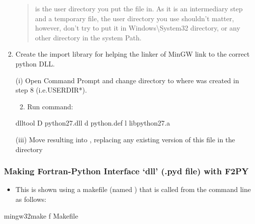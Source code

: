 \documentclass[letterpaper,10pt,english]{sphinxmanual}
\begin{document}
\begin{enumerate}
\begin{quote}
  is the user directory you put the file in. As it is
an intermediary step and a temporary file, the user directory you use
shouldn’t matter, however, don’t try to put it in Windows\textbackslash{}System32
directory, or any other directory in the system Path.
\end{quote}

\item {} 
Create the import library  for helping the linker of
MinGW link to the correct python DLL.

(i) Open Command Prompt and change directory to where  was
created in step 8 (i.e.USERDIR*).
\begin{enumerate}
\setcounter{enumii}{1}
\item {} 
Run command:

\end{enumerate}

%
\begin{sphinxVerbatim}[commandchars=\\\{\}]
dlltool \textendash{}D python27.dll \textendash{}d python.def \textendash{}l libpython27.a
\end{sphinxVerbatim}

(iii) Move resulting  into  ,
replacing any existing version of this file in the directory

\end{enumerate}


\subsubsection{Making Fortran-Python Interface ‘dll’ (.pyd file) with F2PY}
\label{\detokenize{DevelopmentGuidelines:making-fortran-python-interface-dll-pyd-file-with-f2py}}\begin{itemize}
\item {} 
This is shown using a makefile (named ) that is called from
the command line as follows:

\end{itemize}

%
\begin{sphinxVerbatim}[commandchars=\\\{\}]
mingw32\PYGZhy{}make  \textendash{}f  Makefile
\end{sphinxVerbatim}
\end{document}
